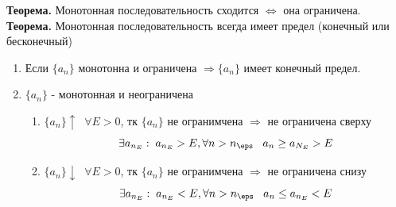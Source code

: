 \textbf{Теорема.} Монотонная последовательность сходится $\Leftrightarrow$ она ограничена. \\
\textbf{Теорема.} Монотонная последовательность всегда имеет предел (конечный или бесконечный)
\begin{tcolorbox}[title=Доказательство]
	\begin{enumerate}
		\item Если $\{a_n\}$ монотонна и ограничена $\Rightarrow \{a_n\}$ имеет конечный предел.
		\item $\{a_n\}$ - монотонная и неограничена
			\begin{enumerate}
				\item $\{a_n\} \uparrow\;\; \forall E > 0$, тк $\{a_n\}$ не огранимчена $\Rightarrow$ не ограничена сверху
				\[ \exists a_{n_E}:\; a_{n_E} > E, \forall n > n_\eps \;\;\; a_n \geq a_{N_E} > E\]
			\item $\{a_n\} \downarrow\;\; \forall E > 0$, тк $\{a_n\}$ не огранимчена $\Rightarrow$ не ограничена снизу
				\[ \exists a_{n_E}:\; a_{n_E} < E, \forall n > n_\eps \;\;\; a_n \leq a_{n_E} < E\]
			\end{enumerate}
	\end{enumerate}
\end{tcolorbox}


